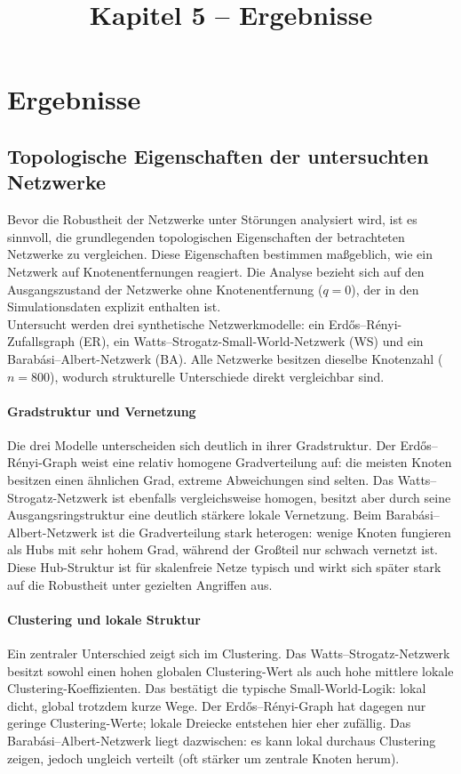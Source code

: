\documentclass[12pt,a4paper]{article}
\title{Kapitel 5 -- Ergebnisse}
\author{}
\date{}
\begin{document}
\maketitle

\section{Ergebnisse}

\subsection{Topologische Eigenschaften der untersuchten Netzwerke}

Bevor die Robustheit der Netzwerke unter Störungen analysiert wird, ist es
sinnvoll, die grundlegenden topologischen Eigenschaften der betrachteten
Netzwerke zu vergleichen. Diese Eigenschaften bestimmen maßgeblich, wie ein
Netzwerk auf Knotenentfernungen reagiert. Die Analyse bezieht sich auf den
Ausgangszustand der Netzwerke ohne Knotenentfernung ($q = 0$), der in den
Simulationsdaten explizit enthalten ist.\\
Untersucht werden drei synthetische Netzwerkmodelle: ein Erdős--Rényi-Zufallsgraph
(ER), ein Watts--Strogatz-Small-World-Netzwerk (WS) und ein
Barabási--Albert-Netzwerk (BA). Alle Netzwerke besitzen dieselbe Knotenzahl
($n=800$), wodurch strukturelle Unterschiede direkt vergleichbar sind.

\paragraph{Gradstruktur und Vernetzung}
Die drei Modelle unterscheiden sich deutlich in ihrer Gradstruktur. Der
Erdős--Rényi-Graph weist eine relativ homogene Gradverteilung auf: die meisten
Knoten besitzen einen ähnlichen Grad, extreme Abweichungen sind selten. Das
Watts--Strogatz-Netzwerk ist ebenfalls vergleichsweise homogen, besitzt aber
durch seine Ausgangsringstruktur eine deutlich stärkere lokale Vernetzung. Beim
Barabási--Albert-Netzwerk ist die Gradverteilung stark heterogen: wenige Knoten
fungieren als Hubs mit sehr hohem Grad, während der Großteil nur schwach
vernetzt ist. Diese Hub-Struktur ist für skalenfreie Netze typisch und wirkt
sich später stark auf die Robustheit unter gezielten Angriffen aus.

\paragraph{Clustering und lokale Struktur}
Ein zentraler Unterschied zeigt sich im Clustering. Das Watts--Strogatz-Netzwerk
besitzt sowohl einen hohen globalen Clustering-Wert als auch hohe mittlere
lokale Clustering-Koeffizienten. Das bestätigt die typische Small-World-Logik:
lokal dicht, global trotzdem kurze Wege. Der Erdős--Rényi-Graph hat dagegen nur
geringe Clustering-Werte; lokale Dreiecke entstehen hier eher zufällig. Das
Barabási--Albert-Netzwerk liegt dazwischen: es kann lokal durchaus Clustering
zeigen, jedoch ungleich verteilt (oft stärker um zentrale Knoten herum).
\end{document}
